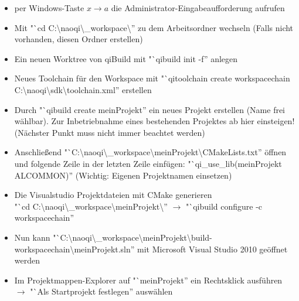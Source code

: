             \begin{itemize}
                \item per Windows-Taste $x \rightarrow a$ die
                    Administrator-Eingabeaufforderung aufrufen

                \item Mit "`cd C:\textbackslash{}naoqi\textbackslash{}\_workspace\textbackslash{}''
                    zu dem Arbeitsordner wechseln (Falls nicht vorhanden, diesen
                    Ordner erstellen)

                \item Ein neuen Worktree von qiBuild mit "`qibuild init -f''
                    anlegen

                \item Neues Toolchain für den Workspace  mit
                    "`qitoolchain create workspacechain C:\textbackslash{}naoqi\textbackslash{}sdk\textbackslash{}toolchain.xml''
                    erstellen

                \item Durch "`qibuild create meinProjekt'' ein neues Projekt
                    erstellen (Name frei wählbar).
                    Zur Inbetriebnahme eines bestehenden Projektes ab hier
                    einsteigen! (Nächster Punkt muss nicht immer beachtet werden)

                \item Anschließend
                    "`C:\textbackslash{}naoqi\textbackslash{}\_workspace\textbackslash{}meinProjekt\textbackslash{}CMakeLists.txt'' öffnen
                    und folgende Zeile in der letzten Zeile einfügen:
                    "`qi\_use\_lib(meinProjekt ALCOMMON)''
                    (Wichtig: Eigenen Projektnamen einsetzen)

                \item Die Visualstudio Projektdateien mit CMake generieren \\
                    "`cd C:\textbackslash{}naoqi\textbackslash{}\_workspace\textbackslash{}meinProjekt\textbackslash{}''
                    $\rightarrow$
                    "`qibuild configure -c workspacechain''


                \item Nun kann
                    "`C:\textbackslash{}naoqi\textbackslash{}\_workspace\textbackslash{}meinProjekt\textbackslash{}build-workspacechain\textbackslash{}meinProjekt.sln''
                    mit Microsoft Visual Studio 2010 geöffnet werden

                \item Im Projektmappen-Explorer auf "`meinProjekt'' ein
                    Rechtsklick ausführen $\rightarrow$
                    "`Als Startprojekt festlegen'' auswählen

            \end{itemize}

